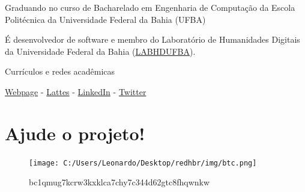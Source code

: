 \documentclass[
]{book}
\begin{document}
Graduando no curso de Bacharelado em Engenharia de Computação da Escola Politécnica da Universidade Federal da Bahia (UFBA)

É desenvolvedor de software e membro do Laboratório de Humanidades Digitais da Universidade Federal da Bahia (\href{http://www.labhd.ufba.br/}{LABHDUFBA}).

Currículos e redes acadêmicas

\href{https://gabrielsandrade.github.io}{Webpage} - \href{http://lattes.cnpq.br/4915378425369073}{Lattes} - \href{https://www.linkedin.com/in/gabriel-andrade-633996108}{LinkedIn} - \href{https://twitter.com/ga_brieell_}{Twitter}

\hypertarget{ajude-o-projeto}{%
\section{Ajude o projeto!}\label{ajude-o-projeto}}

\begin{figure}
\centering
\texttt{[image: C:/Users/Leonardo/Desktop/redhbr/img/btc.png]}
\caption{bc1qmug7kcrw3kxklca7chy7c344d62gtc8fhqwnkw}
\end{figure}

  
\end{document}
